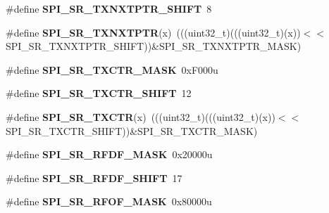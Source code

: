 \begin{DoxyCompactItemize}
\item 
\#define {\bfseries S\+P\+I\+\_\+\+S\+R\+\_\+\+T\+X\+N\+X\+T\+P\+T\+R\+\_\+\+S\+H\+I\+FT}~8\hypertarget{group__SPI__Register__Masks_ga129ad514464ae667c6d78ee9840236d5}{}\label{group__SPI__Register__Masks_ga129ad514464ae667c6d78ee9840236d5}

\item 
\#define {\bfseries S\+P\+I\+\_\+\+S\+R\+\_\+\+T\+X\+N\+X\+T\+P\+TR}(x)~(((uint32\+\_\+t)(((uint32\+\_\+t)(x))$<$$<$S\+P\+I\+\_\+\+S\+R\+\_\+\+T\+X\+N\+X\+T\+P\+T\+R\+\_\+\+S\+H\+I\+FT))\&S\+P\+I\+\_\+\+S\+R\+\_\+\+T\+X\+N\+X\+T\+P\+T\+R\+\_\+\+M\+A\+SK)\hypertarget{group__SPI__Register__Masks_gabc6d25e4bdcb3abacedb397ad24b0bc3}{}\label{group__SPI__Register__Masks_gabc6d25e4bdcb3abacedb397ad24b0bc3}

\item 
\#define {\bfseries S\+P\+I\+\_\+\+S\+R\+\_\+\+T\+X\+C\+T\+R\+\_\+\+M\+A\+SK}~0x\+F000u\hypertarget{group__SPI__Register__Masks_gaba58e43f829f6e6103933bf570e9feb7}{}\label{group__SPI__Register__Masks_gaba58e43f829f6e6103933bf570e9feb7}

\item 
\#define {\bfseries S\+P\+I\+\_\+\+S\+R\+\_\+\+T\+X\+C\+T\+R\+\_\+\+S\+H\+I\+FT}~12\hypertarget{group__SPI__Register__Masks_gad7fc9ecdd51f12aabb492271648e133b}{}\label{group__SPI__Register__Masks_gad7fc9ecdd51f12aabb492271648e133b}

\item 
\#define {\bfseries S\+P\+I\+\_\+\+S\+R\+\_\+\+T\+X\+C\+TR}(x)~(((uint32\+\_\+t)(((uint32\+\_\+t)(x))$<$$<$S\+P\+I\+\_\+\+S\+R\+\_\+\+T\+X\+C\+T\+R\+\_\+\+S\+H\+I\+FT))\&S\+P\+I\+\_\+\+S\+R\+\_\+\+T\+X\+C\+T\+R\+\_\+\+M\+A\+SK)\hypertarget{group__SPI__Register__Masks_gad5bd8906225c5b7e8ed97cacd8a0d3bd}{}\label{group__SPI__Register__Masks_gad5bd8906225c5b7e8ed97cacd8a0d3bd}

\item 
\#define {\bfseries S\+P\+I\+\_\+\+S\+R\+\_\+\+R\+F\+D\+F\+\_\+\+M\+A\+SK}~0x20000u\hypertarget{group__SPI__Register__Masks_ga71c5bf00b7a6fdd6df9f46068d43cc90}{}\label{group__SPI__Register__Masks_ga71c5bf00b7a6fdd6df9f46068d43cc90}

\item 
\#define {\bfseries S\+P\+I\+\_\+\+S\+R\+\_\+\+R\+F\+D\+F\+\_\+\+S\+H\+I\+FT}~17\hypertarget{group__SPI__Register__Masks_gab969720c704e5da43908b804881bd512}{}\label{group__SPI__Register__Masks_gab969720c704e5da43908b804881bd512}

\item 
\#define {\bfseries S\+P\+I\+\_\+\+S\+R\+\_\+\+R\+F\+O\+F\+\_\+\+M\+A\+SK}~0x80000u\hypertarget{group__SPI__Register__Masks_gaec13b65c44bed521e4800ecd6f7e838a}{}\label{group__SPI__Register__Masks_gaec13b65c44bed521e4800ecd6f7e838a}


\end{DoxyCompactItemize}
